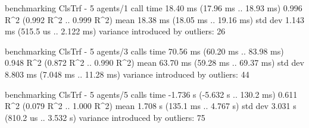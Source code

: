 \begin{showCode}
    benchmarking ClsTrf - 5 agents/1 call
    time                 18.40 ms   (17.96 ms .. 18.93 ms)
                         0.996 R^2   (0.992 R^2 .. 0.999 R^2)
    mean                 18.38 ms   (18.05 ms .. 19.16 ms)
    std dev              1.143 ms   (515.5 us .. 2.122 ms)
    variance introduced by outliers: 26%

    benchmarking ClsTrf - 5 agents/3 calls
    time                 70.56 ms   (60.20 ms .. 83.98 ms)
                         0.948 R^2   (0.872 R^2 .. 0.990 R^2)
    mean                 63.70 ms   (59.28 ms .. 69.37 ms)
    std dev              8.803 ms   (7.048 ms .. 11.28 ms)
    variance introduced by outliers: 44%

    benchmarking ClsTrf - 5 agents/5 calls
    time                 -1.736 s   (-5.632 s .. 130.2 ms)
                         0.611 R^2   (0.079 R^2 .. 1.000 R^2)
    mean                 1.708 s    (135.1 ms .. 4.767 s)
    std dev              3.031 s    (810.2 us .. 3.532 s)
    variance introduced by outliers: 75%

\end{showCode}